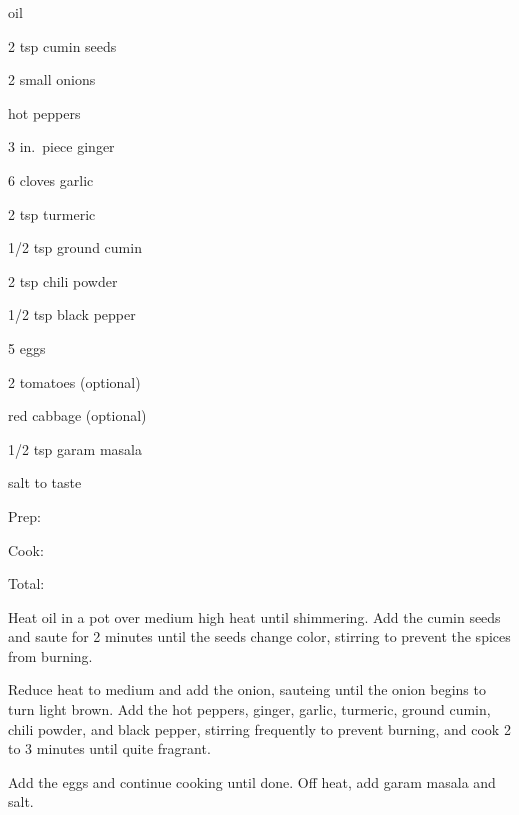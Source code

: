 \documentclass[oneside]{book}  %
\newcommand{\itemNL}{\item[] \hspace{-\labelsep}}  %
\begin{document}
\begin{IT}
  \begin{ingredients}
    \itemNL oil
    \item[2 tsp] cumin seeds
    \item[2 small] onions
    \itemNL hot peppers
    \item[3 in.\ piece] ginger
    \item[6 cloves] garlic
    \item[2 tsp] turmeric
    \item[1/2 tsp] ground cumin
    \item[2 tsp] chili powder
    \item[1/2 tsp] black pepper
    \item[5] eggs
    \item[2] tomatoes (optional)
    \itemNL red cabbage (optional)
    \item[1/2 tsp] garam masala
    \itemNL salt to taste
  \end{ingredients}

  \switchcolumn

  \begin{timeline}
    \item[Prep:]  \todo
    \item[Cook:]  \todo
    \item[Total:] \todo
  \end{timeline}
\end{IT}

\begin{directions}
  \item Heat oil in a pot over medium high heat until shimmering. Add the cumin
    seeds and saute for 2 minutes until the seeds change color, stirring to
    prevent the spices from burning.
  \item Reduce heat to medium and add the onion, sauteing until the onion begins
    to turn light brown. Add the hot peppers, ginger, garlic, turmeric, ground
    cumin, chili powder, and black pepper, stirring frequently to prevent
    burning, and cook 2 to 3 minutes until quite fragrant.
  \item Add the eggs and continue cooking until done. Off heat, add garam masala
    and salt.
\end{directions}

\end{document}
